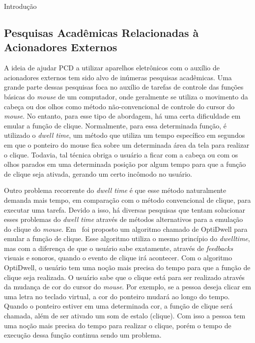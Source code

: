 \begin{chapter}{Introdução}
 
\subsection {Pesquisas Acadêmicas Relacionadas à Acionadores Externos}

A ideia de ajudar PCD a utilizar aparelhos eletrônicos com o auxílio de
acionadores externos tem sido alvo de inúmeras pesquisas acadêmicas. Uma grande
parte dessas pesquisas foca no auxílio de tarefas de controle das funções
básicas do \textit{mouse} de um computador, onde geralmente se utiliza o
movimento da cabeça ou dos olhos como método não-convencional de controle do
cursor do \textit{mouse}. No entanto, para esse tipo de abordagem, há uma certa
dificuldade em emular a função de clique.  Normalmente, para essa determinada
função, é utilizado o \textit{dwell time}, um método que utiliza um tempo
específico em segundos em que o ponteiro do mouse fica sobre um determinada área
da tela para realizar  o clique. Todavia, tal técnica obriga o usuário a ficar
com a cabeça ou com os olhos parados em uma determinada posição por algum tempo
para que a função de clique seja ativada, gerando um certo incômodo no usuário.

Outro problema recorrente do \textit{dwell time} é que esse método naturalmente
demanda mais tempo, em comparação com o método convencional de clique, para
executar uma tarefa. Devido a isso, há diversas pesquisas que tentam solucionar
esses problemas do \textit{dwell time} através de métodos alternativos para a
emulação do clique do \textit{mouse}.  Em~\cite{Aanand18} foi proposto um
algoritmo chamado de OptiDwell para emular a função de clique.  Esse algoritmo
utiliza o mesmo princípio do \textit{dwelltime}, mas com a diferença de que o
usuário sabe exatamente, através de \textit{feedbacks} visuais e sonoros, quando
o evento de clique irá acontecer.  Com o algoritmo OptiDwell, o usuário tem uma
noção mais precisa do tempo para que a função de clique seja realizada. O
usuário sabe que o clique está para ser realizado através da mudança de cor do
cursor do \textit{mouse}. Por exemplo, se a pessoa deseja clicar em uma letra no
teclado virtual, a cor do ponteiro mudará ao longo do tempo. Quando o
ponteiro estiver em uma determinada cor, a função de clique será chamada, além
de ser ativado um som de estalo (clique). Com isso a pessoa tem uma noção mais
precisa do tempo para realizar o clique, porém o tempo de execução dessa função
continua sendo um problema.


\end{chapter}
